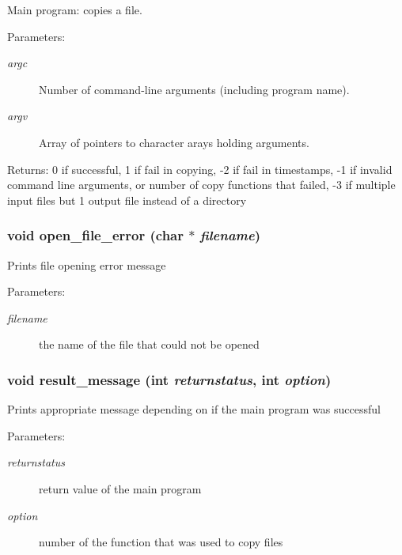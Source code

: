 Main program: copies a file. \begin{Desc}
\item[Parameters:]
\begin{description}
\item[{\em argc}]Number of command-line arguments (including program name). \item[{\em argv}]Array of pointers to character arays holding arguments. \end{description}
\end{Desc}
\begin{Desc}
\item[Returns:]0 if successful, 1 if fail in copying, -2 if fail in timestamps, -1 if invalid command line arguments, or number of copy functions that failed, -3 if multiple input files but 1 output file instead of a directory \end{Desc}
\subsubsection{\setlength{\rightskip}{0pt plus 5cm}void open\_\-file\_\-error (char $\ast$ {\em filename})}\label{cptest1_8c_24e89f857b6c4f8cfadd8bf854978b28}


Prints file opening error message \begin{Desc}
\item[Parameters:]
\begin{description}
\item[{\em filename}]the name of the file that could not be opened \end{description}
\end{Desc}
\subsubsection{\setlength{\rightskip}{0pt plus 5cm}void result\_\-message (int {\em returnstatus}, int {\em option})}\label{cptest1_8c_772406db6caedde5006575a15b4b3e7b}


Prints appropriate message depending on if the main program was successful \begin{Desc}
\item[Parameters:]
\begin{description}
\item[{\em returnstatus}]return value of the main program \item[{\em option}]number of the function that was used to copy files \end{description}
\end{Desc}
